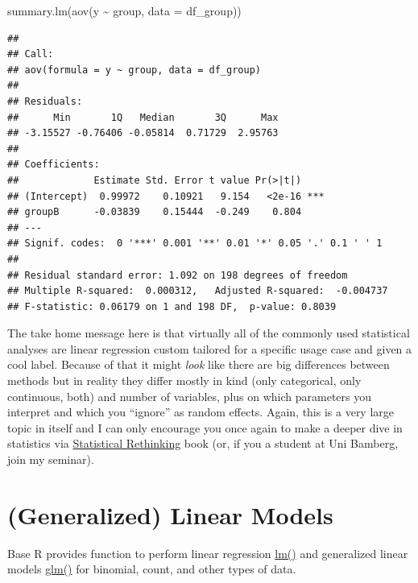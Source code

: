 \documentclass[
]{book}
\newenvironment{Shaded}{\begin{snugshade}}{\end{snugshade}}
\newcommand{\AttributeTok}[1]{\textcolor[rgb]{0.77,0.63,0.00}{#1}}
\newcommand{\FunctionTok}[1]{\textcolor[rgb]{0.00,0.00,0.00}{#1}}
\newcommand{\NormalTok}[1]{#1}
\newcommand{\SpecialCharTok}[1]{\textcolor[rgb]{0.00,0.00,0.00}{#1}}
\begin{document}
\begin{Shaded}
\begin{Highlighting}[]
\FunctionTok{summary.lm}\NormalTok{(}\FunctionTok{aov}\NormalTok{(y }\SpecialCharTok{\textasciitilde{}}\NormalTok{ group, }\AttributeTok{data =}\NormalTok{ df\_group))}
\end{Highlighting}
\end{Shaded}

\begin{verbatim}
## 
## Call:
## aov(formula = y ~ group, data = df_group)
## 
## Residuals:
##      Min       1Q   Median       3Q      Max 
## -3.15527 -0.76406 -0.05814  0.71729  2.95763 
## 
## Coefficients:
##             Estimate Std. Error t value Pr(>|t|)    
## (Intercept)  0.99972    0.10921   9.154   <2e-16 ***
## groupB      -0.03839    0.15444  -0.249    0.804    
## ---
## Signif. codes:  0 '***' 0.001 '**' 0.01 '*' 0.05 '.' 0.1 ' ' 1
## 
## Residual standard error: 1.092 on 198 degrees of freedom
## Multiple R-squared:  0.000312,   Adjusted R-squared:  -0.004737 
## F-statistic: 0.06179 on 1 and 198 DF,  p-value: 0.8039
\end{verbatim}

The take home message here is that virtually all of the commonly used statistical analyses are linear regression custom tailored for a specific usage case and given a cool label. Because of that it might \emph{look} like there are big differences between methods but in reality they differ mostly in kind (only categorical, only continuous, both) and number of variables, plus on which parameters you interpret and which you ``ignore'' as random effects. Again, this is a very large topic in itself and I can only encourage you once again to make a deeper dive in statistics via \href{https://www.routledge.com/Statistical-Rethinking-A-Bayesian-Course-with-Examples-in-R-and-STAN/McElreath/p/book/9780367139919}{Statistical Rethinking} book (or, if you a student at Uni Bamberg, join my seminar).

\hypertarget{GLMM}{%
\section{(Generalized) Linear Models}\label{GLMM}}

Base R provides function to perform linear regression \href{https://stat.ethz.ch/R-manual/R-devel/library/stats/html/lm.html}{lm()} and generalized linear models \href{https://stat.ethz.ch/R-manual/R-devel/library/stats/html/glm.html}{glm()} for binomial, count, and other types of data.
\end{document}
